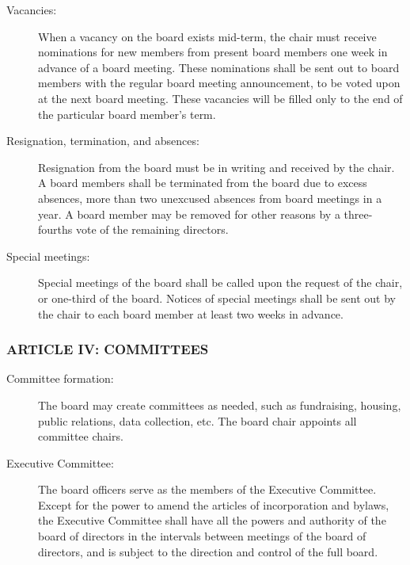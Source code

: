 \documentclass[12pt]{article}
\begin{document}
\begin{description}
\item[Vacancies:] When a vacancy on the board exists mid-term, the
chair must receive nominations for new members from present board
members one week in advance of a board meeting. These nominations
shall be sent out to board members with the regular board meeting
announcement, to be voted upon at the next board meeting. These
vacancies will be filled only to the end of the particular board
member's term.

\item[Resignation, termination, and absences:] Resignation from the
board must be in writing and received by the chair. A board
members shall be terminated from the board due to excess absences,
more than two unexcused absences from board meetings in a year. A
board member may be removed for other reasons by a three-fourths vote
of the remaining directors.

\item[Special meetings:] Special meetings of the board shall be called
upon the request of the chair, or one-third of the board. Notices of
special meetings shall be sent out by the chair to each board
member at least two weeks in advance.
\end{description}

\subsubsection*{ARTICLE IV: COMMITTEES}

\begin{description}
\item[Committee formation:] The board may create committees as needed,
such as fundraising, housing, public relations, data collection, etc.
The board chair appoints all committee chairs.

\item[Executive Committee:] The board officers serve as the members of
the Executive Committee. Except for the power to amend the articles of
incorporation and bylaws, the Executive Committee shall have all the
powers and authority of the board of directors in the intervals
between meetings of the board of directors, and is subject to the
direction and control of the full board.

\end{description}
\end{document}
